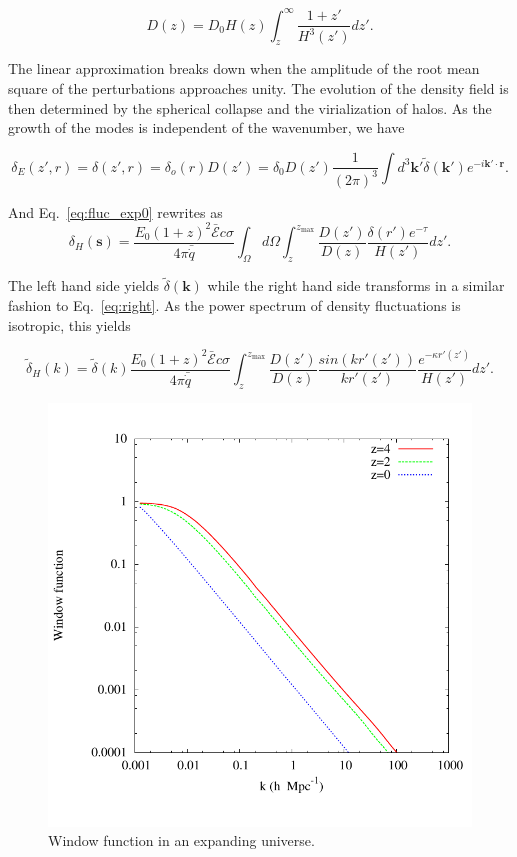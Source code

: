 \documentclass[twocolumns]{emulateapj}
\begin{document}
\begin{equation}
  \label{eq:growth_1}
  D(z)=D_0H(z)\int_z^{\infty}\frac{1+z'}{H^3(z')}dz'.
\end{equation}

The linear approximation breaks down when the amplitude of the root mean square of the perturbations approaches unity. The evolution of the density field is then determined by the spherical collapse \citep{1972ApJ...176....1G} and the virialization of halos. As the growth of the modes is independent of the wavenumber, we have

\begin{equation}
  \label{eq:FT_delta}
  \delta_E(z',r)=\delta(z',r)=\delta_o(r)D(z')=\delta_0D(z')\frac{1}{(2\pi)^3}\int d^3\mathbf{k'} \tilde{\delta}(\mathbf{k'}) e^{-i\mathbf{k'}\cdot\mathbf{r}}.
\end{equation}


And Eq.~\eqref{eq:fluc_exp0}  rewrites as
\begin{equation}
  \label{eq:heat_fluc_exp0}
  \delta_H(\mathbf{s})=\frac{ E_0(1+z)^2 \bar{\mathcal{E}} c\sigma}{4\pi\bar{\dot{q}}} \int_{\Omega}d\Omega\int_z^{z_{\mathrm{max}}}  \frac{D(z')}{D(z)} \frac{\delta(r') e^{-\tau}}{H(z')}dz'.
\end{equation}


The left hand side yields $\tilde{\delta}(\mathbf{k})$ while the right hand side transforms in a similar fashion to Eq.~\eqref{eq:right}. As the power spectrum of density fluctuations is isotropic, this  yields

\begin{equation}
  \label{eq:heat_fluc_exp1}
  \tilde{\delta}_H(k)=\tilde{\delta}(k) \frac{E_0(1+z)^2\bar{\mathcal{E}}c\sigma}{4\pi\bar{\dot{q}}} \int_z^{z_{\mathrm{max}}} \frac{D(z')}{D(z)}\frac{sin(kr'(z'))}{kr'(z')}    \frac{e^{-\kappa r'(z')}} {H(z')}  dz'.
\end{equation}

\begin{figure}[h]
  \centering
  \includegraphics[width = .45\textwidth ]{window_nobiases-eps-converted-to}
  \caption{Window function in an expanding universe.}
  \label{fig:window_nobiases}
\end{figure}
\end{document}
